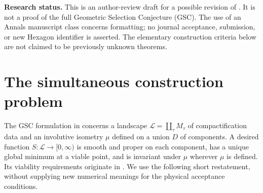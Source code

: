 \begin{abstract}
We study what an explicit construction would have to establish for the
Geometric Selection Conjecture. We give a smooth globally proper selection
functional once a compatible viable point is supplied, distinguish this
marked-point construction from a selector intrinsic to an unmarked metric,
and prove a quantitative criterion for simultaneous stabilization and
preservation of physical mass inequalities. We independently check the
slope, Chern-class and index data of a published tetraquadric line-bundle
example. An explicit normalization example shows that a holomorphic Yukawa
hierarchy need not be a physical hierarchy. A local supersymmetric effective
theory has an isolated minimum with broken supersymmetry, but its realization
by the compactification is not established. No vacuum satisfying all nine
conditions is constructed, and the full conjecture remains open.
\end{abstract}
\maketitle

\noindent\textbf{Research status.} This is an author-review draft for a
possible revision of \cite{Mirror}. It is not a proof of the full Geometric
Selection Conjecture (GSC). The use of an Annals manuscript class concerns
formatting; no journal acceptance, submission, or new Hexagon identifier
is asserted. The elementary construction criteria below are not claimed
to be previously unknown theorems.

\section{The simultaneous construction problem}
The GSC formulation in \cite{Dwork,Mirror} concerns a landscape
$\mathcal L=\coprod_\tau M_\tau$ of compactification data and an involutive
isometry $\mu$ defined on a union $D$ of components. A desired function
$S:\mathcal L\to[0,\infty)$ is smooth and proper on each component,
has a unique global minimum at a viable point, and is invariant under
$\mu$ wherever $\mu$ is defined. Its viability requirements originate in
\cite{Original}. We use the following short restatement, without supplying
new numerical meanings for the physical acceptance conditions.

